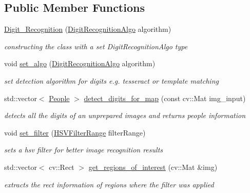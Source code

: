 \subsection*{Public Member Functions}
\begin{DoxyCompactItemize}
\item 
\mbox{\hyperlink{class_image_processing_1_1_digit___recognition_a24fef82ef6c94ddda8c841f9eb408872}{Digit\+\_\+\+Recognition}} (\mbox{\hyperlink{namespace_image_processing_afe66b5cb462eb22dcf108308418c09eb}{Digit\+Recognition\+Algo}} algorithm)
\begin{DoxyCompactList}\small\item\em constructing the class with a set Digit\+Recognition\+Algo type \end{DoxyCompactList}\item 
\mbox{\label{class_image_processing_1_1_digit___recognition_a7bd2d754921d45fcb83e7f58aa906b93}} 
void \mbox{\hyperlink{class_image_processing_1_1_digit___recognition_a7bd2d754921d45fcb83e7f58aa906b93}{set\+\_\+algo}} (\mbox{\hyperlink{namespace_image_processing_afe66b5cb462eb22dcf108308418c09eb}{Digit\+Recognition\+Algo}} algorithm)
\begin{DoxyCompactList}\small\item\em set detection algorithm for digits e.\+g. tesseract or template matching \end{DoxyCompactList}\item 
\mbox{\label{class_image_processing_1_1_digit___recognition_ad156b8e3a96651e6f65272507dfd77da}} 
std\+::vector$<$ \mbox{\hyperlink{class_people}{People}} $>$ \mbox{\hyperlink{class_image_processing_1_1_digit___recognition_ad156b8e3a96651e6f65272507dfd77da}{detect\+\_\+digits\+\_\+for\+\_\+map}} (const cv\+::\+Mat img\+\_\+input)
\begin{DoxyCompactList}\small\item\em detects all the digits of an unprepared images and returns people information \end{DoxyCompactList}\item 
void \mbox{\hyperlink{class_image_processing_1_1_digit___recognition_adfae039ca51d000e71273256b3eb9279}{set\+\_\+filter}} (\mbox{\hyperlink{struct_image_processing_1_1_h_s_v_filter_range}{H\+S\+V\+Filter\+Range}} filter\+Range)
\begin{DoxyCompactList}\small\item\em sets a hsv filter for better image recognition results \end{DoxyCompactList}\item 
std\+::vector$<$ cv\+::\+Rect $>$ \mbox{\hyperlink{class_image_processing_1_1_digit___recognition_a365719825f80b3f5c503d88b43b5fc25}{get\+\_\+regions\+\_\+of\+\_\+interest}} (cv\+::\+Mat \&img)
\begin{DoxyCompactList}\small\item\em extracts the rect information of regions where the filter was applied \end{DoxyCompactList}\end{DoxyCompactItemize}
